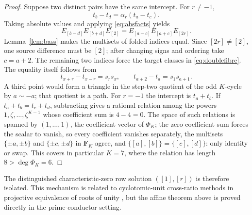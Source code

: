 \begin{proof}
Suppose two distinct pairs have the same intercept.  For $r\ne-1$,
\[
t_b-t_d=\alpha_r(t_a-t_c).
\]
Taking absolute values and applying \eqref{eq:absfacts} yields
\[
E_{[b-d]}E_{[b+d]}E_{[2]}
 =E_{[a-c]}E_{[a+c]}E_{[2r]}.
\]
Lemma~\ref{lem:bass} makes the multisets of folded indices equal.  Since
$[2r]\ne[2]$, one source difference must be $[2]$; after changing signs and
ordering take $c=a+2$.  The remaining two indices force the target classes in
\eqref{eq:doublefibre}.  The equality itself follows from
\[
t_{x+r}-t_{x-r}=s_rs_x,
\qquad
t_{a+2}-t_a=s_1s_{a+1}.
\]
A third point would form a triangle in the step-two quotient of the odd
$K$-cycle by $a\sim-a$; that quotient is a path.  For $r=-1$ the intercept is
$t_a+t_b$.  If $t_a+t_b=t_c+t_d$, subtracting gives a rational relation
among the powers $1,\zeta,\ldots,\zeta^{K-1}$ whose coefficient sum is
$4-4=0$.  The space of such relations is spanned by $(1,\ldots,1)$, the
coefficient vector of $\Phi_K$; the zero coefficient sum forces the scalar
to vanish, so every coefficient vanishes separately, the multisets
$\{\pm a,\pm b\}$ and $\{\pm c,\pm d\}$ in $\mathbf F_K$ agree, and
$\{[a],[b]\}=\{[c],[d]\}$: only identity or swap.  This covers in
particular $K=7$, where the relation has length $8>\deg\Phi_K=6$.
\end{proof}

The distinguished characteristic-zero row solution $([1],[r])$ is therefore
isolated.  This mechanism is related to cyclotomic-unit cross-ratio methods in
projective equivalence of roots of unity \cite{Fu2022}, but the affine theorem
above is proved directly in the prime-conductor setting.
